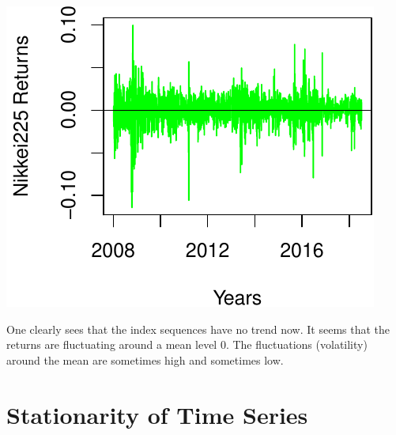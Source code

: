 \documentclass[11pt,]{article}
\newenvironment{Shaded}{\begin{snugshade}}{\end{snugshade}}
\newcommand{\KeywordTok}[1]{\textcolor[rgb]{0.13,0.29,0.53}{\textbf{#1}}}
\newcommand{\DataTypeTok}[1]{\textcolor[rgb]{0.13,0.29,0.53}{#1}}
\newcommand{\DecValTok}[1]{\textcolor[rgb]{0.00,0.00,0.81}{#1}}
\newcommand{\FloatTok}[1]{\textcolor[rgb]{0.00,0.00,0.81}{#1}}
\newcommand{\StringTok}[1]{\textcolor[rgb]{0.31,0.60,0.02}{#1}}
\newcommand{\CommentTok}[1]{\textcolor[rgb]{0.56,0.35,0.01}{\textit{#1}}}
\newcommand{\OperatorTok}[1]{\textcolor[rgb]{0.81,0.36,0.00}{\textbf{#1}}}
\newcommand{\NormalTok}[1]{#1}
\begin{document}
\begin{Shaded}
\end{Shaded}

\begin{center}\includegraphics{FMC_T4_PhD_Fin_Time_Series_files/figure-latex/return_market_index_func-2} \end{center}

One clearly sees that the index sequences have no trend now. It seems
that the returns are fluctuating around a mean level 0. The fluctuations
(volatility) around the mean are sometimes high and sometimes low.

\section{Stationarity of Time Series}\label{stationarity-of-time-series}
\end{document}
